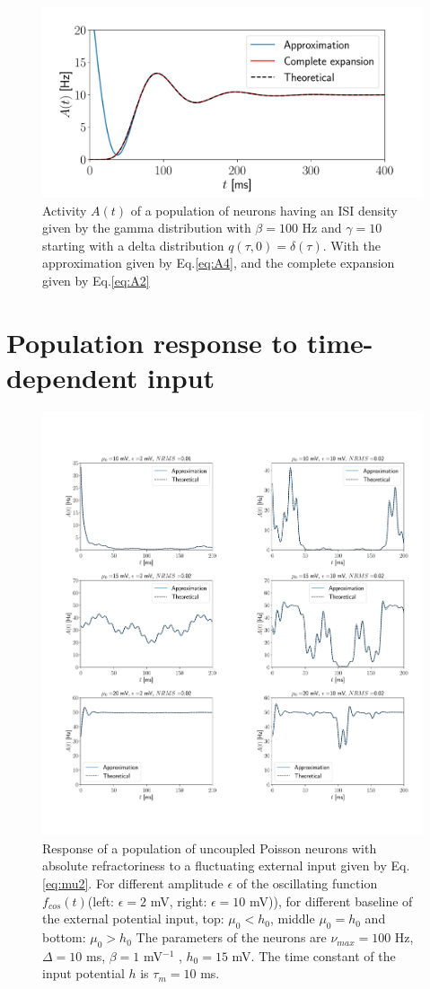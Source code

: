\documentclass[12pt,twoside]{report}
\begin{document}
\begin{figure}[h!]
	\centering
	\includegraphics[width=0.8\linewidth]{delta_gamma.pdf}
	\caption{Activity $A(t)$ of a population of neurons having an ISI density given by the gamma distribution with $\beta=100$ Hz and $\gamma=10$ starting with a delta distribution $q(\tau,0)=\delta(\tau)$. With the approximation given by Eq.\eqref{eq:A4}, and the complete expansion given by Eq.\eqref{eq:A2}}
	\label{fig:delta_gamma}
\end{figure}


\section{Population response to time-dependent input}
\label{sec:uncoupletimedep}

\begin{figure}[h!]
	\centering
	\includegraphics[width=0.9\linewidth]{A_t.pdf}
	\caption{Response of a population of uncoupled Poisson neurons with absolute refractoriness to a fluctuating external input given by Eq.\eqref{eq:mu2}. For different amplitude $\epsilon$ of the oscillating function $f_{cos}(t)$(left: $\epsilon=2$ mV, right: $\epsilon=10$ mV)), for different baseline of the external potential input, top: $\mu_0 < h_0$, middle  $\mu_0 = h_0$ and bottom: $\mu_0 > h_0$ The parameters of the neurons are $\nu_{max}=100$ Hz, $\Delta=10$ ms, $\beta=1$ mV$^{-1}$ , $h_0=15$ mV. The time constant of the input potential $h$ is $\tau_m=10$ ms.
	}
	\label{fig:A_t}
\end{figure}
\end{document}
